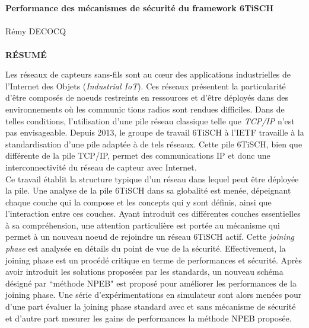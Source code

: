 \documentclass[]{report}
\begin{document}
\newpage
~
\newpage

\vspace{5cm}
~\\

\begin{center}
\textbf{\Large Performance des mécanismes de sécurité du framework 6TiSCH}\\
~\\
{\Large Rémy DECOCQ}\\
~\\
\textbf{\Large RÉSUMÉ}
\end{center}
\vspace{2cm}

\large
Les réseaux de capteurs sans-fils sont au cœur des applications industrielles de l'Internet des Objets (\textit{Industrial IoT}). Ces réseaux présentent la particularité d'être composés de noeuds restreints en ressources et d'être déployés dans des environnements où les communic	tions radios sont rendues difficiles. Dans de telles conditions, l'utilisation d'une pile réseau classique telle que \textit{TCP/IP} n'est pas envisageable. Depuis 2013, le groupe de travail 6TiSCH à l'IETF travaille à la standardisation d'une pile adaptée à de tels réseaux. Cette pile 6TiSCH, bien que différente de la pile TCP/IP, permet des communications IP et donc une interconnectivité du réseau de capteur avec Internet.\\

Ce travail établit la structure typique d'un réseau dans lequel peut être déployée la pile. Une analyse de la pile 6TiSCH dans sa globalité est menée, dépeignant chaque couche qui la compose et les concepts qui y sont définis, ainsi que l'interaction entre ces couches. Ayant introduit ces différentes couches essentielles à sa compréhension, une attention particulière est portée au mécanisme qui permet à un nouveau noeud de rejoindre un réseau 6TiSCH actif. Cette \textit{joining phase} est analysée en détails du point de vue de la sécurité. Effectivement, la joining phase est un procédé critique en terme de performances et sécurité.  Après avoir introduit les solutions proposées par les standards, un nouveau schéma désigné par ``méthode NPEB" est proposé pour améliorer les performances de la joining phase. Une série d'expérimentations en simulateur sont alors menées pour d'une part évaluer la joining phase standard avec et sans mécanisme de sécurité et d'autre part mesurer les gains de performances la méthode NPEB proposée.\\
\end{document}
